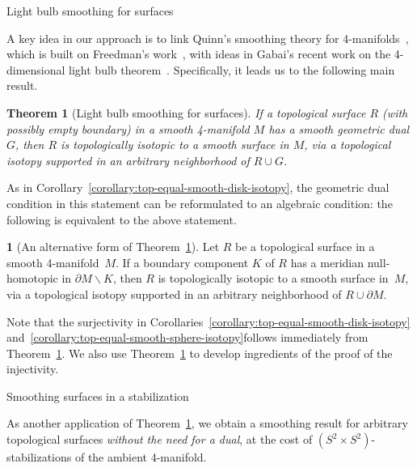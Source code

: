 \documentclass[11pt]{amsart}
\makeatletter
\def\subsection{\@startsection{subsection}{2}%
  \z@{-.8\linespacing\@plus-.3\linespacing}{.5\linespacing\@plus.2\linespacing}%
  {\normalfont\bfseries\large}}
\newtheorem{theoremalpha}{Theorem}\def\thetheoremalpha{\Alph{theoremalpha}}
\theoremstyle{definition}
\theoremstyle{theorem-giventitle}
\newtheorem{theorem-named}{}
\theoremstyle{definition-giventitle}
\numberwithin{equation}{section}
\def\setminus{\smallsetminus}
\makeatother
\begin{document}
\subsection{Light bulb smoothing for surfaces}

A key idea in our approach is to link Quinn's smoothing theory for 4-manifolds~\cite{Quinn:1982-1,Quinn:1984-2,Freedman-Quinn:1990-1}, which is built on Freedman's work~\cite{Freedman:1982-1,Freedman:1984-1,Freedman-Quinn:1990-1}, with ideas in Gabai's recent work on the 4-dimensional light bulb theorem~\cite{Gabai:2020-1}.
Specifically, it leads us to the following main result.

\begin{theoremalpha}[Light bulb smoothing for surfaces]
  \label{theorem:light-bulb-smoothing}
  If a topological surface $R$ (with possibly empty boundary) in a smooth 4-manifold $M$ has a smooth geometric dual $G$, then $R$ is topologically isotopic to a smooth surface in $M$, via a topological isotopy supported in an arbitrary neighborhood of $R\cup G$.
\end{theoremalpha}

As in Corollary~\ref{corollary:top-equal-smooth-disk-isotopy}, the geometric dual condition in this statement can be reformulated to an algebraic condition: the following is equivalent to the above statement.

\begin{theorem-named}
  [An alternative form of Theorem~\ref{theorem:light-bulb-smoothing}]
  Let $R$ be a topological surface in a smooth 4-manifold~$M$.
  If a boundary component $K$ of $R$ has a meridian null-homotopic in $\partial M\setminus K$, then $R$ is topologically isotopic to a smooth surface in~$M$, via a topological isotopy supported in an arbitrary neighborhood of $R\cup \partial M$.
\end{theorem-named}

Note that the surjectivity in Corollaries~\ref{corollary:top-equal-smooth-disk-isotopy} and~\ref{corollary:top-equal-smooth-sphere-isotopy}\@ follows immediately from Theorem~\ref{theorem:light-bulb-smoothing}\@.
We also use Theorem~\ref{theorem:light-bulb-smoothing} to develop ingredients of the proof of the injectivity.


\subsection{Smoothing surfaces in a stabilization}

As another application of Theorem~\ref{theorem:light-bulb-smoothing}, we obtain a smoothing result for arbitrary topological surfaces \emph{without the need for a dual}, at the cost of $(S^2\times S^2)$-stabilizations of the ambient 4-manifold.
\end{document}
